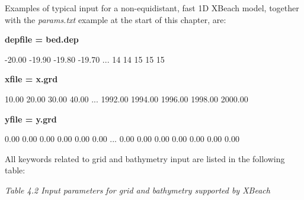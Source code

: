 \documentclass{article}
\begin{document}
\noindent Examples of typical input for a non-equidistant, fast 1D XBeach model, together with the \textit{params.txt} example at the start of this chapter, are:

\noindent \textbf{depfile = bed.dep}

 -20.00 -19.90 -19.80 -19.70 ... 14 14 15 15 15 

\noindent \textbf{xfile = x.grd}

 10.00 20.00 30.00 40.00 ... 1992.00 1994.00 1996.00 1998.00 2000.00

\noindent \textbf{yfile = y.grd}

 0.00 0.00 0.00 0.00 0.00 0.00 ... 0.00 0.00 0.00 0.00 0.00 0.00 0.00

\noindent All keywords related to grid and bathymetry input are listed in the following table:

\noindent \textit{Table 4.2 Input parameters for grid and bathymetry supported by XBeach}
\end{document}
